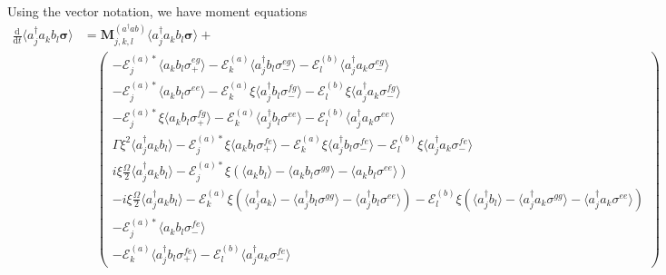 \documentclass{article}
\newcommand{\ddt}[1][]{\frac{\mathrm{d} #1}{\mathrm{d}t}}
\begin{document}
Using the vector notation, we have moment equations
\begin{subequations}
	\begin{align}
		\ddt \langle a^{\dagger}_{j} a_{k} b_{l} \bm{\sigma} \rangle &= \bm{M}_{j, k, l}^{(a^{\dagger} a b)} \langle a^{\dagger}_{j} a_{k} b_{l} \bm{\sigma} \rangle + \nonumber \\
		&\quad
		\begin{pmatrix}
			-\mathcal{E}_{j}^{(a) *} \langle a_{k} b_{l} \sigma^{eg}_{+} \rangle - \mathcal{E}_{k}^{(a)} \langle a^{\dagger}_{j} b_{l} \sigma^{eg}_{-} \rangle - \mathcal{E}_{l}^{(b)} \langle a^{\dagger}_{j} a_{k} \sigma^{eg}_{-} \rangle \\
			-\mathcal{E}_{j}^{(a) *} \langle a_{k} b_{l} \sigma^{ee} \rangle - \mathcal{E}_{k}^{(a)} \xi \langle a^{\dagger}_{j} b_{l} \sigma^{fg}_{-} \rangle - \mathcal{E}_{l}^{(b)} \xi \langle a^{\dagger}_{j} a_{k} \sigma^{fg}_{-} \rangle \\
			-\mathcal{E}_{j}^{(a) *} \xi \langle a_{k} b_{l} \sigma^{fg}_{+} \rangle - \mathcal{E}_{k}^{(a)} \langle a^{\dagger}_{j} b_{l} \sigma^{ee} \rangle - \mathcal{E}_{l}^{(b)} \langle a^{\dagger}_{j} a_{k} \sigma^{ee} \rangle \\
			\Gamma \xi^{2} \langle a^{\dagger}_{j} a_{k} b_{l} \rangle - \mathcal{E}_{j}^{(a) *} \xi \langle a_{k} b_{l} \sigma^{fe}_{+} \rangle - \mathcal{E}_{k}^{(a)} \xi \langle a^{\dagger}_{j} b_{l} \sigma^{fe}_{-} \rangle - \mathcal{E}_{l}^{(b)} \xi \langle a^{\dagger}_{j} a_{k} \sigma^{fe}_{-} \rangle \\
			i \xi \frac{\Omega}{2} \langle a^{\dagger}_{j} a_{k} b_{l} \rangle - \mathcal{E}_{j}^{(a) *} \xi \left( \langle a_{k} b_{l} \rangle - \langle a_{k} b_{l} \sigma^{gg} \rangle - \langle a_{k} b_{l} \sigma^{ee} \rangle \right) \\
			-i \xi \frac{\Omega}{2} \langle a^{\dagger}_{j} a_{k} b_{l} \rangle - \mathcal{E}_{k}^{(a)} \xi \left( \langle a^{\dagger}_{j} a_{k} \rangle - \langle a^{\dagger}_{j} b_{l} \sigma^{gg} \rangle - \langle a^{\dagger}_{j} b_{l} \sigma^{ee} \rangle \right) - \mathcal{E}_{l}^{(b)} \xi \left( \langle a^{\dagger}_{j} b_{l} \rangle - \langle a^{\dagger}_{j} a_{k} \sigma^{gg} \rangle - \langle a^{\dagger}_{j} a_{k} \sigma^{ee} \rangle \right) \\
			-\mathcal{E}_{j}^{(a) *} \langle a_{k} b_{l} \sigma^{fe}_{-} \rangle \\
			-\mathcal{E}_{k}^{(a)} \langle a^{\dagger}_{j} b_{l} \sigma^{fe}_{+} \rangle - \mathcal{E}_{l}^{(b)} \langle a^{\dagger}_{j} a_{k} \sigma^{fe}_{-} \rangle

\end{pmatrix}
\end{align}
\end{subequations}
\end{document}
